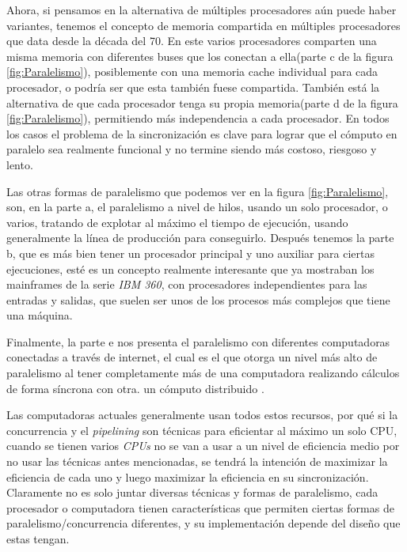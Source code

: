 \documentclass[letterpaper,12pt,oneside]{book}
\begin{document}
		Ahora, si pensamos en la alternativa de múltiples procesadores aún puede haber variantes, tenemos el concepto de memoria compartida
		en múltiples procesadores que data desde la década del 70. En este varios procesadores comparten una misma memoria con diferentes
		buses que los conectan a ella(parte c de la figura \ref{fig:Paralelismo}), posiblemente con una memoria cache individual para cada procesador, o 
		podría ser
		que esta también fuese compartida. También está la alternativa de que cada procesador tenga su propia memoria(parte d de la figura 
		\ref{fig:Paralelismo}), permitiendo más independencia
		a cada procesador. En todos los casos el problema de la sincronización es clave para lograr que el cómputo en paralelo sea realmente funcional
		y no termine siendo más costoso, riesgoso y lento\cite{null_essentials_2003}.
		
		Las otras formas de paralelismo que podemos ver en la figura \ref{fig:Paralelismo}, son, en la parte a, el paralelismo
		a nivel de hilos, usando un solo procesador, o varios, tratando de explotar al máximo el tiempo de ejecución, usando generalmente 
		la línea de producción para conseguirlo. Después tenemos la parte b, que es más
		bien tener un procesador principal y uno auxiliar para ciertas ejecuciones, esté es un concepto realmente interesante que ya mostraban
		los mainframes de la serie \textit{IBM 360}, con procesadores independientes para las entradas y salidas, que suelen ser unos de los procesos más
		complejos que tiene una máquina\cite{tanenbaum_structured_2013}.
        
        Finalmente, la parte e nos presenta el paralelismo
		con diferentes computadoras conectadas a través de internet, el cual es el que otorga un nivel más alto de paralelismo al tener completamente
		más de una computadora realizando cálculos de forma síncrona con otra. un cómputo distribuido \cite{tanenbaum_structured_2013}.

		
		Las computadoras actuales generalmente usan todos estos recursos, por qué si la concurrencia y el \textit{pipelining} son técnicas
		para eficientar al máximo un solo CPU, cuando se tienen varios \textit{CPUs} no se van a usar a un nivel de eficiencia medio por no
		usar las técnicas antes mencionadas, se tendrá la intención de maximizar la eficiencia de cada uno y luego maximizar la eficiencia
		en su sincronización. Claramente no es solo juntar diversas técnicas y formas de paralelismo, cada procesador o computadora
		tienen características que permiten ciertas formas de paralelismo/concurrencia diferentes, y su implementación depende del diseño que estas
		tengan\cite{tanenbaum_structured_2013}.
\end{document}

